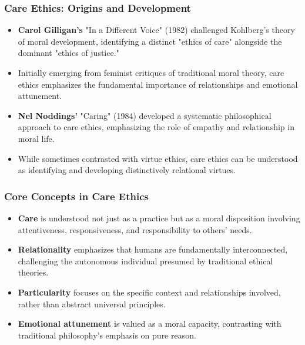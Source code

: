 \documentclass{beamer}
\begin{document}
\begin{frame}
    \frametitle{Care Ethics: Origins and Development}
    \begin{itemize}
        \item \textbf{Carol Gilligan's} "In a Different Voice" (1982) challenged Kohlberg's theory of moral development, identifying a distinct "ethics of care" alongside the dominant "ethics of justice."
        
        \item Initially emerging from feminist critiques of traditional moral theory, care ethics emphasizes the fundamental importance of relationships and emotional attunement.
        
        \item \textbf{Nel Noddings'} "Caring" (1984) developed a systematic philosophical approach to care ethics, emphasizing the role of empathy and relationship in moral life.
        
        \item While sometimes contrasted with virtue ethics, care ethics can be understood as identifying and developing distinctively relational virtues.
    \end{itemize}
\end{frame}

\begin{frame}
    \frametitle{Core Concepts in Care Ethics}
    \begin{itemize}
        \item \textbf{Care} is understood not just as a practice but as a moral disposition involving attentiveness, responsiveness, and responsibility to others' needs.
        
        \item \textbf{Relationality} emphasizes that humans are fundamentally interconnected, challenging the autonomous individual presumed by traditional ethical theories.
        
        \item \textbf{Particularity} focuses on the specific context and relationships involved, rather than abstract universal principles.
        
        \item \textbf{Emotional attunement} is valued as a moral capacity, contrasting with traditional philosophy's emphasis on pure reason.
    \end{itemize}
\end{frame}
\end{document}
